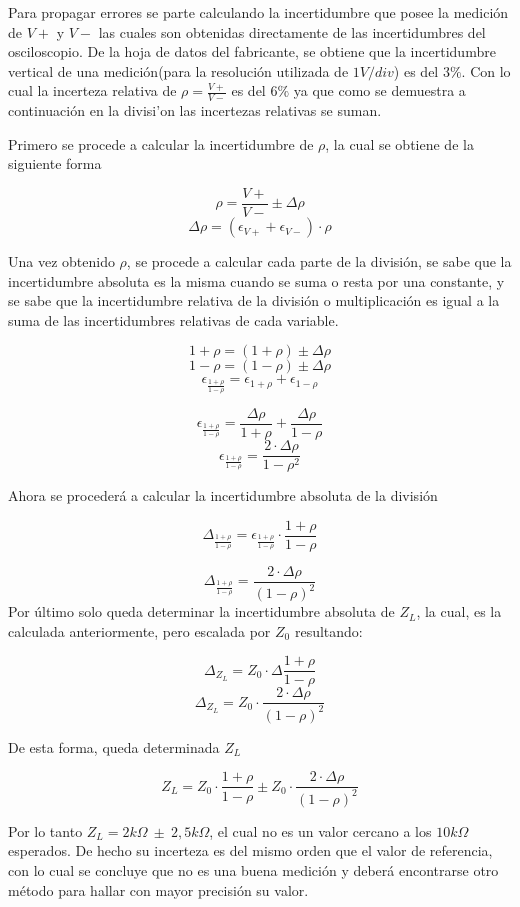 \documentclass[a4paper,10pt]{article}
\begin{document}
	\indent Para propagar errores se parte calculando la incertidumbre que posee
	la medición de $V+$ y $V-$ las cuales son obtenidas directamente de las 
	incertidumbres del osciloscopio. De la hoja de datos del fabricante, se obtiene que la incertidumbre vertical de una medici\'on(para la resoluci\'on utilizada de $1V/div$) es del $3\%$. Con lo cual la incerteza relativa de $\rho=\frac{V+}{V-}$ es del $6\%$ ya que como se demuestra a continuaci\'on en la divisi'on las incertezas relativas se suman.
	
	\indent Primero se procede a calcular la incertidumbre de $\rho$, la cual se
	obtiene de la siguiente forma
	
	$$\rho = \frac{V+}{V-} \pm \Delta\rho$$
	$$\Delta\rho = (\epsilon_{V+} + \epsilon_{V-})\cdot\rho$$

	\indent Una vez obtenido $\rho$, se procede a calcular cada parte de la 
	división, se sabe que la incertidumbre absoluta es la misma cuando se suma o
	resta por una constante, y se sabe que la incertidumbre relativa de la 
	división o multiplicación es igual a la suma de las incertidumbres relativas
	de cada variable.

	$$1 + \rho = (1 + \rho) \pm \Delta\rho$$
	$$1 - \rho = (1 - \rho) \pm \Delta\rho$$
	$$\epsilon_{\frac{1 + \rho}{1 - \rho}} = \epsilon_{1 + \rho} + 
	\epsilon_{1 - \rho}$$

	$$\epsilon_{\frac{1 + \rho}{1 - \rho}} = \frac{\Delta\rho}{1 + \rho} + 
	\frac{\Delta\rho}{1 - \rho}$$
	$$\epsilon_{\frac{1 + \rho}{1 - \rho}} = \frac{2\cdot\Delta\rho}
	{1 - \rho^2}$$
	
	\indent Ahora se procederá a calcular la incertidumbre absoluta de la 
	división

	$$\Delta_{\frac{1 + \rho}{1 - \rho}} = \epsilon_{\frac{1 + \rho}{1 - \rho}}
	\cdot\frac{1+\rho}{1 - \rho}$$
	
	$$\Delta_{\frac{1 + \rho}{1 - \rho}} = \frac{2\cdot\Delta\rho}{(1 - \rho)^2}
	$$
	\indent Por último solo queda determinar la incertidumbre absoluta de $Z_L$,
	la cual, es la calculada anteriormente, pero escalada por $Z_0$ resultando:

	$$\Delta_{Z_L} = Z_0\cdot\Delta\frac{1 + \rho}{1 - \rho}$$
	$$\Delta_{Z_L} = Z_0\cdot\frac{2\cdot\Delta\rho}{(1 - \rho)^2}$$

	\indent De esta forma, queda determinada $Z_L$

	$$Z_L =Z_0\cdot\frac{1+\rho}{1-\rho} \pm Z_0\cdot\frac{2\cdot\Delta\rho}
	{(1 - \rho)^2}$$

	\indent Por lo tanto $Z_L=2k\Omega~\pm~2,5k\Omega$, el cual no es un valor cercano a los
	$10k\Omega$  esperados. De hecho su incerteza es del mismo orden que el valor de referencia, con lo cual se concluye que no es una buena medici\'on y deber\'a encontrarse otro m\'etodo para hallar con mayor precisi\'on su valor.\\
		
\end{document}
